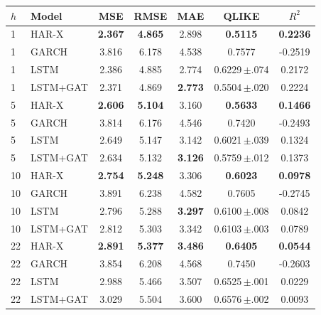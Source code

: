 \begin{tabular}{llccccc}
\toprule
$h$ & Model & MSE & RMSE & MAE & QLIKE & $R^2$ \\
\midrule
1 & HAR-X & \textbf{2.367} & \textbf{4.865} & 2.898 & \textbf{0.5115} & \textbf{0.2236} \\
1 & GARCH & 3.816 & 6.178 & 4.538 & 0.7577 & -0.2519 \\
1 & LSTM & 2.386 & 4.885 & 2.774 & 0.6229\,$\pm$.074 & 0.2172 \\
1 & LSTM+GAT & 2.371 & 4.869 & \textbf{2.773} & 0.5504\,$\pm$.020 & 0.2224 \\
\midrule
5 & HAR-X & \textbf{2.606} & \textbf{5.104} & 3.160 & \textbf{0.5633} & \textbf{0.1466} \\
5 & GARCH & 3.814 & 6.176 & 4.546 & 0.7420 & -0.2493 \\
5 & LSTM & 2.649 & 5.147 & 3.142 & 0.6021\,$\pm$.039 & 0.1324 \\
5 & LSTM+GAT & 2.634 & 5.132 & \textbf{3.126} & 0.5759\,$\pm$.012 & 0.1373 \\
\midrule
10 & HAR-X & \textbf{2.754} & \textbf{5.248} & 3.306 & \textbf{0.6023} & \textbf{0.0978} \\
10 & GARCH & 3.891 & 6.238 & 4.582 & 0.7605 & -0.2745 \\
10 & LSTM & 2.796 & 5.288 & \textbf{3.297} & 0.6100\,$\pm$.008 & 0.0842 \\
10 & LSTM+GAT & 2.812 & 5.303 & 3.342 & 0.6103\,$\pm$.003 & 0.0789 \\
\midrule
22 & HAR-X & \textbf{2.891} & \textbf{5.377} & \textbf{3.486} & \textbf{0.6405} & \textbf{0.0544} \\
22 & GARCH & 3.854 & 6.208 & 4.568 & 0.7450 & -0.2603 \\
22 & LSTM & 2.988 & 5.466 & 3.507 & 0.6525\,$\pm$.001 & 0.0229 \\
22 & LSTM+GAT & 3.029 & 5.504 & 3.600 & 0.6576\,$\pm$.002 & 0.0093 \\
\bottomrule
\end{tabular}

